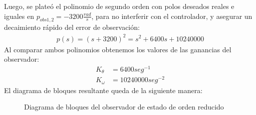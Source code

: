 \documentclass[a4paper, 10pt, onecolumn,journal]{ieeeconf}
\begin{document}
Luego, se plateó el polinomio de segundo orden con polos deseados reales e iguales en $p_{obs1,2} = -3200 \frac{rad}{s}$, para no interferir con el controlador, y asegurar un decaimiento rápido del error de observación:
\begin{align}
	p(s) = \left( s + 3200\right) ^2 = s^2 + 6400 s + 10240000\label{polinomeo caracteristico de observador deseado}
\end{align}
Al comparar ambos polinomios obtenemos los valores de las ganancias del observador:
\begin{align}
	K_{\theta} &= 6400 seg^{-1}\label{ganacia de posicion de observador}\\
	K_{\omega} &= 10240000 seg^{-2}\label{ganacia de velocidad de observador}
\end{align}
El diagrama de bloques resultante queda de la siguiente manera:
\begin{figure}[thpb]
	\centering
	\begin{adjustbox}{max width=\columnwidth}
	\end{adjustbox}
	\caption{Diagrama de bloques del observador de estado de orden reducido}
	\label{Diagrama de bloques del observador de estado de orden reducido}
\end{figure}
\end{document}
